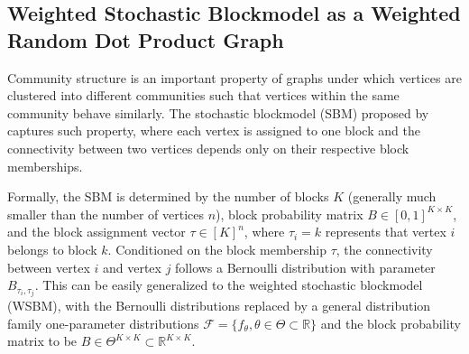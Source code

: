 \documentclass[a4paper]{article}
\newtheorem{definition}[fact]{Definition}
\begin{document}




\subsection{Weighted Stochastic Blockmodel as a Weighted Random Dot Product Graph}
\label{section:WSBM}

Community structure is an important property of graphs under which vertices are clustered into different communities such that vertices within the same community behave similarly. The stochastic blockmodel (SBM) proposed by \citet{holland1983stochastic} captures such property, where each vertex is assigned to one block and the connectivity between two vertices depends only on their respective block memberships.

Formally, the SBM is determined by the number of blocks $K$ (generally much smaller than the number of vertices $n$), block probability matrix $B \in [0, 1]^{K \times K}$, and the block assignment vector $\tau \in [K]^n$, where $\tau_i = k$ represents that vertex $i$ belongs to block $k$. Conditioned on the block membership $\tau$, the connectivity between vertex $i$ and vertex $j$ follows a Bernoulli distribution with parameter $B_{\tau_i, \tau_j}$. This can be easily generalized to the weighted stochastic blockmodel (WSBM), with the Bernoulli distributions replaced by a general distribution family one-parameter distributions $\mathcal{F} = \{ f_{\theta}, \theta \in \Theta \subset \mathbb{R} \}$ and the block probability matrix to be $B \in \Theta^{K \times K} \subset \mathbb{R}^{K \times K}$.
\end{document}
